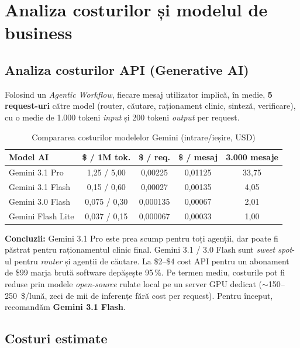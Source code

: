 \section{Analiza costurilor și modelul de business}

\subsection{Analiza costurilor API (Generative AI)}

Folosind un \textit{Agentic Workflow}, fiecare mesaj utilizator implică, în medie, \textbf{5 request-uri} către model (router, căutare, raționament clinic, sinteză, verificare), cu o medie de 1.000 tokeni \textit{input} și 200 tokeni \textit{output} per request.

\begin{table}[H]
\centering
\small
\begin{tabular}{lcccc}
\toprule
\textbf{Model AI} & \textbf{\$ / 1M tok.} & \textbf{\$ / req.} & \textbf{\$ / mesaj} & \textbf{3.000 mesaje} \\
\midrule
Gemini 3.1 Pro     & 1{,}25 / 5{,}00   & 0{,}00225  & 0{,}01125 & 33{,}75 \\
Gemini 3.1 Flash   & 0{,}15 / 0{,}60   & 0{,}00027  & 0{,}00135 &  4{,}05 \\
Gemini 3.0 Flash   & 0{,}075 / 0{,}30  & 0{,}000135 & 0{,}00067 &  2{,}01 \\
Gemini Flash Lite  & 0{,}037 / 0{,}15  & 0{,}000067 & 0{,}00033 &  1{,}00 \\
\bottomrule
\end{tabular}
\caption{Compararea costurilor modelelor Gemini (intrare/ieșire, USD)}
\label{tab:costuri_ai}
\end{table}

\textbf{Concluzii:} Gemini 3.1 Pro este prea scump pentru toți agenții, dar poate fi păstrat pentru raționamentul clinic final. Gemini 3.1 / 3.0 Flash sunt \textit{sweet spot}-ul pentru \textit{router} și agenții de căutare. La \$2--\$4 cost API pentru un abonament de \$99 marja brută software depășește 95\,\%. Pe termen mediu, costurile pot fi reduse prin modele \textit{open-source} rulate local pe un server GPU dedicat ($\sim$150--250~\$/lună, zeci de mii de inferențe fără cost per request). Pentru început, recomandăm \textbf{Gemini 3.1 Flash}.

\subsection{Costuri estimate}

